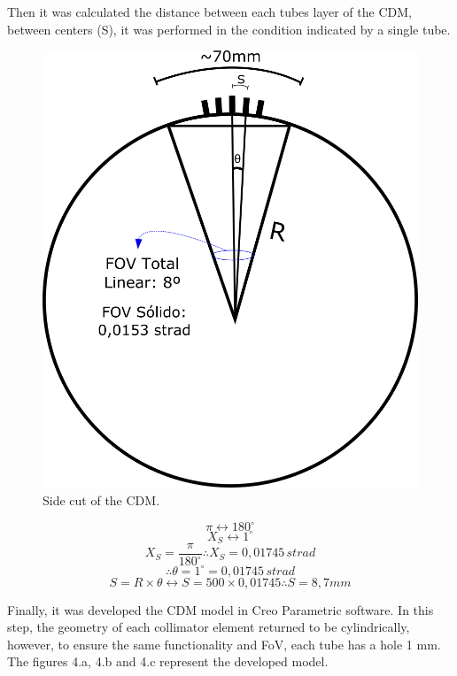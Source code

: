 \documentclass[a4paper,12pt]{article}
\begin{document}
Then it was calculated the distance between each tubes layer of the CDM, between centers (S), it was performed in the condition indicated by a single tube.
\begin{figure}[htb] 
	\centering
	\includegraphics[scale=0.25]{MCD_3.jpg}
	\caption{Side cut of the CDM.}
\end{figure}

$$ \pi \longleftrightarrow 180^{\circ}$$
$$ X_{S} \longleftrightarrow 1^{\circ}$$
$$X_{S} = \frac{\pi}{180^{\circ}} \therefore X_{S} = 0,01745\, strad$$
$$\therefore \theta = 1^{\circ} = 0,01745 \,strad$$
$$S= R\times \theta \longleftrightarrow S= 500\times 0,01745 \therefore S=8,7mm $$

Finally, it was developed the CDM model in Creo Parametric software. In this step,
the geometry of each collimator element returned to be cylindrically, however, to ensure the
same functionality and FoV, each tube has a hole 1 mm. The figures 4.a,
4.b and 4.c represent the developed model.
\end{document}
